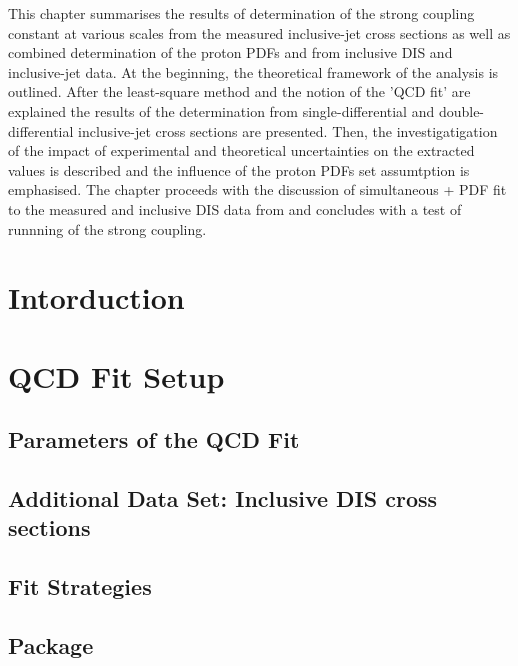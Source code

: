 This chapter summarises the results of determination of the strong coupling constant at various scales from the measured inclusive-jet cross sections as well as combined determination of the proton PDFs and \asz from inclusive DIS and inclusive-jet data. At the beginning, the theoretical framework of the analysis is outlined. After the least-square method and the notion of the 'QCD fit' are explained the results of the \asz determination from single-differential and double-differential inclusive-jet cross sections are presented. Then, the investigatigation of the impact of experimental and theoretical uncertainties on the extracted \asz values is described and the influence of the proton PDFs set assumtption is emphasised. The chapter proceeds with the discussion of simultaneous \as + PDF fit to the measured and inclusive DIS data from \hera and concludes with a test of runnning of the strong coupling.

\section{Intorduction}
\label{sec:qcdfitintro}


\section{QCD Fit Setup}
\label{sec:fitsettings}


\subsection{Parameters of the QCD Fit}
\label{subsec:qcdfitparams}


\subsection{Additional Data Set: Inclusive DIS cross sections}
\label{subsec:inclusivedisdata}


\subsection{Fit Strategies}
\label{subsec:fitstategy}


\subsection{\herafitter Package}
\label{subsec:herfitter}


